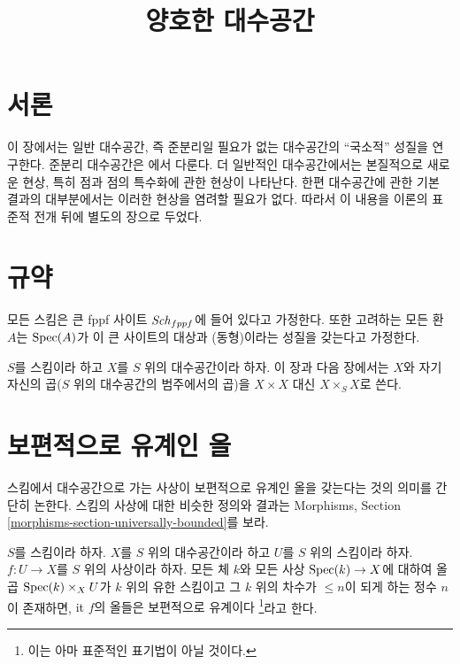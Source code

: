 

%


\title{양호한 대수공간}


\maketitle

\label{section-phantom}

\tableofcontents

\section{서론}
\label{section-introduction}

\noindent
이 장에서는 일반 대수공간, 즉 준분리일 필요가 없는 대수공간의
``국소적'' 성질을 연구한다. 준분리 대수공간은 \cite{Kn}에서 다룬다.
더 일반적인 대수공간에서는 본질적으로 새로운 현상, 특히 점과 점의
특수화에 관한 현상이 나타난다. 한편 대수공간에 관한 기본 결과의
대부분에서는 이러한 현상을 염려할 필요가 없다. 따라서 이 내용을
이론의 표준적 전개 뒤에 별도의 장으로 두었다.



\section{규약}
\label{section-conventions}

\noindent
모든 스킴은 큰 fppf 사이트 $\mathit{Sch}_{fppf}$에 들어 있다고 가정한다.
또한 고려하는 모든 환 $A$는 $\mathop{\mathrm{Spec}}(A)$가 이 큰 사이트의 대상과
(동형)이라는 성질을 갖는다고 가정한다.

\medskip\noindent
$S$를 스킴이라 하고 $X$를 $S$ 위의 대수공간이라 하자. 이 장과
다음 장에서는 $X$와 자기 자신의 곱($S$ 위의 대수공간의 범주에서의 곱)을
$X \times X$ 대신 $X \times_S X$로 쓴다.



\section{보편적으로 유계인 올}
\label{section-universally-bounded}

\noindent
스킴에서 대수공간으로 가는 사상이 보편적으로 유계인 올을 갖는다는
것의 의미를 간단히 논한다. 스킴의 사상에 대한 비슷한 정의와 결과는
Morphisms, Section \ref{morphisms-section-universally-bounded}를 보라.

\begin{definition}
\label{definition-universally-bounded}
$S$를 스킴이라 하자. $X$를 $S$ 위의 대수공간이라 하고 $U$를 $S$ 위의
스킴이라 하자. $f : U \to X$를 $S$ 위의 사상이라 하자. 모든 체 $k$와
모든 사상 $\mathop{\mathrm{Spec}}(k) \to X$에 대하여 올곱 $\mathop{\mathrm{Spec}}(k) \times_X U$가
$k$ 위의 유한 스킴이고 그 $k$ 위의 차수가 $\leq n$이 되게 하는 정수
$n$이 존재하면, {it $f$의 올들은 보편적으로 유계이다}
\footnote{이는 아마 표준적인 표기법이 아닐 것이다.}라고 한다.
\end{definition}

